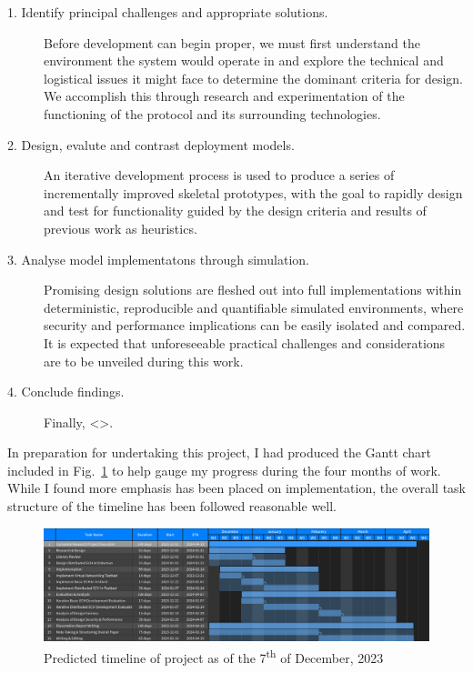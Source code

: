 \begin{description}
	\item[1. Identify principal challenges and appropriate solutions.] Before development can begin proper, we must first understand the environment the system would operate in and explore the technical and logistical issues it might face to determine the dominant criteria for design. We accomplish this through research and experimentation of the functioning of the protocol and its surrounding technologies.
	\item[2. Design, evalute and contrast deployment models.] An iterative development process is used to produce a series of incrementally improved skeletal prototypes, with the goal to rapidly design and test for functionality guided by the design criteria and results of previous work as heuristics.
	\item[3. Analyse model implementatons through simulation.] Promising design solutions are fleshed out into full implementations within deterministic, reproducible and quantifiable simulated environments, where security and performance implications can be easily isolated and compared. It is expected that unforeseeable practical challenges and considerations are to be unveiled during this work.
	\item[4. Conclude findings.] Finally, <>.
\end{description}

In preparation for undertaking this project, I had produced the Gantt chart included in Fig.~\ref{gantt_chart_figure} to help gauge my progress during the four months of work. While I found more emphasis has been placed on implementation, the overall task structure of the timeline has been followed reasonable well.

\begin{figure}[ht]
\centerline{\includegraphics[width=160mm]{images/gantt.png}}
\caption[Project timeline]{Predicted timeline of project as of the 7\textsuperscript{th} of December, 2023}
\label{gantt_chart_figure}
\end{figure}









